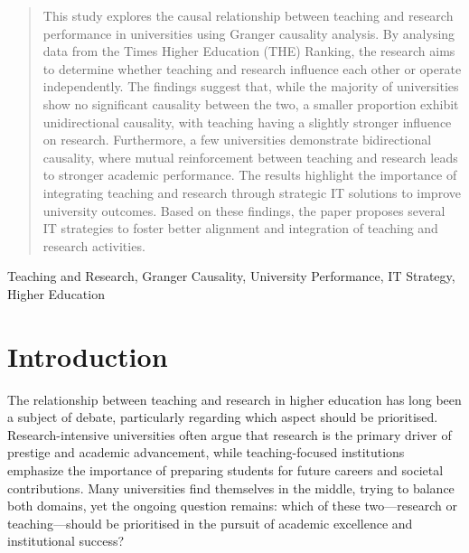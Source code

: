 \documentclass[conference]{IEEEtran}
\begin{document}
\newcommand{\al}[1]{{\textbf{\color{blue} Al: #1}}}

\maketitle

\begin{abstract}
This study explores the causal relationship between teaching and research performance in universities using Granger causality analysis. By analysing data from the Times Higher Education (THE) Ranking, the research aims to determine whether teaching and research influence each other or operate independently. The findings suggest that, while the majority of universities show no significant causality between the two, a smaller proportion exhibit unidirectional causality, with teaching having a slightly stronger influence on research. Furthermore, a few universities demonstrate bidirectional causality, where mutual reinforcement between teaching and research leads to stronger academic performance. The results highlight the importance of integrating teaching and research through strategic IT solutions to improve university outcomes. Based on these findings, the paper proposes several IT strategies to foster better alignment and integration of teaching and research activities.
\end{abstract}

\begin{IEEEkeywords}
Teaching and Research, Granger Causality, University Performance, IT Strategy, Higher Education
\end{IEEEkeywords}


\section{Introduction}
\label{sec:introduction}

The relationship between teaching and research in higher education has long been a subject of debate, particularly regarding which aspect should be prioritised. Research-intensive universities often argue that research is the primary driver of prestige and academic advancement, while teaching-focused institutions emphasize the importance of preparing students for future careers and societal contributions. Many universities find themselves in the middle, trying to balance both domains, yet the ongoing question remains: which of these two—research or teaching—should be prioritised in the pursuit of academic excellence and institutional success?
\end{document}
